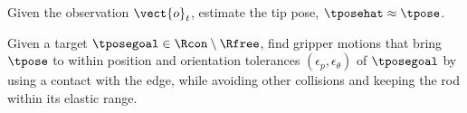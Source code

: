 \begin{problem}\label{prob:estimation}
Given the observation $\vect{o}_t$, estimate the tip pose, $\tposehat\approx\tpose$.
\end{problem}

\begin{problem}\label{prob:manipulation}
Given a target $\tposegoal\in\Rcon\setminus\Rfree$, find gripper motions that
bring $\tpose$ to within position and orientation tolerances
$(\epsilon_p,\epsilon_\theta)$ of $\tposegoal$ by using a contact with the
edge, while avoiding other collisions and keeping the rod within its elastic
range.
\end{problem}
